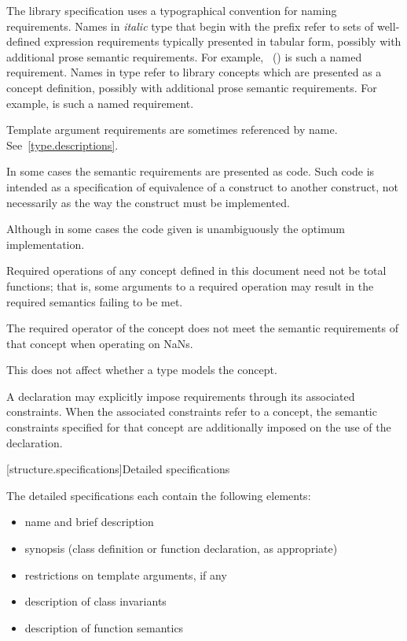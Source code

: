 \pnum
The library specification uses a typographical convention for naming
requirements. Names in \textit{italic} type that begin with the prefix
\oldconcept{} refer to sets of well-defined expression requirements typically
presented in tabular form, possibly with additional prose semantic requirements.
For example, ~() is such a named
requirement. Names in  type refer to library concepts
which are presented as a concept definition, possibly with additional
prose semantic requirements. For example,
is such a named requirement.

\pnum
Template argument requirements are sometimes referenced by name.
See~\ref{type.descriptions}.

\pnum
In some cases the semantic requirements are presented as \Cpp{} code.
Such code is intended as a
specification of equivalence of a construct to another construct, not
necessarily as the way the construct
must be implemented.
\begin{footnote}
Although in some cases the code given is
unambiguously the optimum implementation.
\end{footnote}

\pnum
Required operations of any concept defined in this document need not be
total functions; that is, some arguments to a required operation may
result in the required semantics failing to be met.
\begin{example}
The required \tcode{<} operator of the 
concept does not meet the
semantic requirements of that concept when operating on NaNs.
\end{example}
This does not affect whether a type models the concept.

\pnum
A declaration may explicitly impose requirements through its associated
constraints. When the associated constraints refer to a
concept, the semantic constraints specified for that concept
are additionally imposed on the use of the declaration.

[structure.specifications]{Detailed specifications}

\pnum
The detailed specifications each contain the following elements:%
\begin{itemize}
\item name and brief description
\item synopsis (class definition or function declaration, as appropriate)
\item restrictions on template arguments, if any
\item description of class invariants
\item description of function semantics
\end{itemize}

